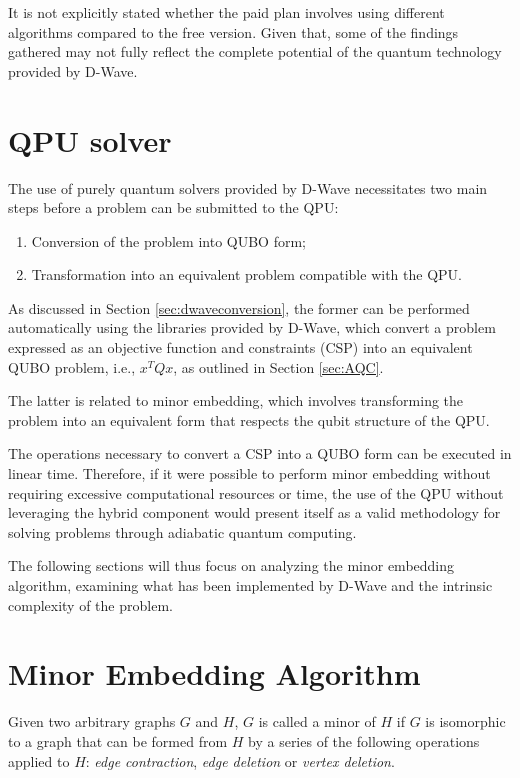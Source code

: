 It is not explicitly stated whether the paid plan involves using different algorithms compared to the free version. 
Given that, some of the findings gathered may not fully reflect the complete potential of the quantum technology provided by D-Wave.

\section{QPU solver}

The use of purely quantum solvers provided by D-Wave necessitates two main steps before a problem can be submitted to the QPU:

\begin{enumerate}
    \item Conversion of the problem into QUBO form;
    \item Transformation into an equivalent problem compatible with the QPU.
\end{enumerate}

As discussed in Section \ref{sec:dwaveconversion}, the former can be performed automatically using the libraries provided by D-Wave, which convert a problem expressed as an objective function and constraints (CSP) into an equivalent QUBO problem, i.e., $x^TQx$, as outlined in Section \ref{sec:AQC}.

The latter is related to minor embedding, which involves transforming the problem into an equivalent form that respects the qubit structure of the QPU.

The operations necessary to convert a CSP into a QUBO form can be executed in linear time. Therefore, if it were possible to perform minor embedding without requiring excessive computational resources or time, the use of the QPU without leveraging the hybrid component would present itself as a valid methodology for solving problems through adiabatic quantum computing.

The following sections will thus focus on analyzing the minor embedding algorithm, examining what has been implemented by D-Wave and the intrinsic complexity of the problem.

\section{Minor Embedding Algorithm}

\begin{displayquote}
    Given two arbitrary graphs $G$ and $H$, $G$ is called a minor of $H$ if $G$ is isomorphic to a graph that can be formed from $H$ by a series of the following operations applied to $H$: \emph{edge contraction}, \emph{edge deletion} or \emph{vertex deletion}.
\end{displayquote}

